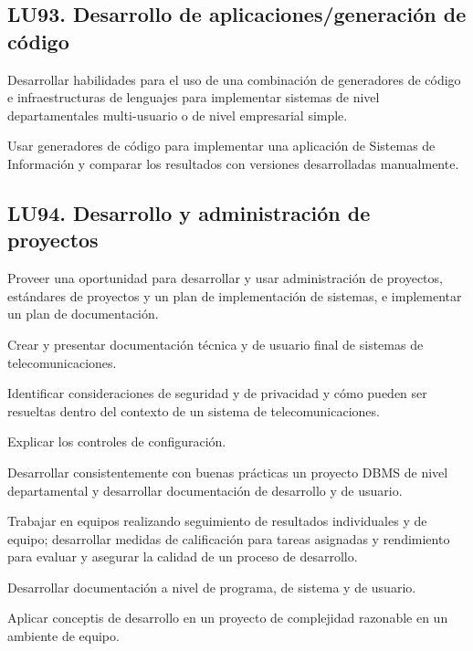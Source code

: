 \subsection{LU93. Desarrollo de aplicaciones/generación de código}\label{sec:BOK-LU93}\label{sec:LU93}
\begin{LearningUnit}
\begin{LUGoal}
\item Desarrollar habilidades para el uso de una combinación de generadores de código e infraestructuras de lenguajes para implementar sistemas de nivel departamentales multi-usuario o de nivel empresarial simple.
\end{LUGoal}

\begin{LUObjective}
\item Usar generadores de código para implementar una aplicación de Sistemas de Información y comparar los resultados con versiones desarrolladas manualmente.
\end{LUObjective}
\end{LearningUnit}

\subsection{LU94. Desarrollo y administración de proyectos}\label{sec:BOK-LU94}\label{sec:LU94}
\begin{LearningUnit}
\begin{LUGoal}
\item Proveer una oportunidad para desarrollar y usar administración de proyectos, estándares de proyectos y un plan de implementación de sistemas, e implementar un plan de documentación.
\end{LUGoal}

\begin{LUObjective}
\item Crear y presentar documentación técnica y de usuario final de sistemas de telecomunicaciones.
\item Identificar consideraciones de seguridad y de privacidad y cómo pueden ser resueltas dentro del contexto de un sistema de telecomunicaciones.
\item Explicar los controles de configuración.
\item Desarrollar consistentemente con buenas prácticas un proyecto DBMS de nivel departamental y desarrollar documentación de desarrollo y de usuario.
\item Trabajar en equipos realizando seguimiento de resultados individuales y de equipo; desarrollar medidas de calificación para tareas asignadas y rendimiento para evaluar y asegurar la calidad de un proceso de desarrollo.
\item Desarrollar documentación a nivel de programa, de sistema y de usuario.
\item Aplicar conceptis de desarrollo en un proyecto de complejidad razonable en un ambiente de equipo.
\end{LUObjective}
\end{LearningUnit}

